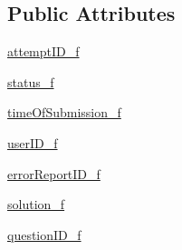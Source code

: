 \subsection*{Public Attributes}
\begin{DoxyCompactItemize}
\item 
\hyperlink{class_ecodena_1_1_attempt_1_1models_1_1_attempt_a5868c5092dc59689fe48af770ea41bc5}{attemptID\_\-f}
\item 
\hyperlink{class_ecodena_1_1_attempt_1_1models_1_1_attempt_aa0e8d9e10aa7d394777a8dcc138b67bf}{status\_\-f}
\item 
\hyperlink{class_ecodena_1_1_attempt_1_1models_1_1_attempt_a4cf15d230e30719df408282601d157fa}{timeOfSubmission\_\-f}
\item 
\hyperlink{class_ecodena_1_1_attempt_1_1models_1_1_attempt_ad138a4fd5a48644d71382b83a9ba4a04}{userID\_\-f}
\item 
\hyperlink{class_ecodena_1_1_attempt_1_1models_1_1_attempt_ac1e3f9e2d93bbdd1d339f9331a560926}{errorReportID\_\-f}
\item 
\hyperlink{class_ecodena_1_1_attempt_1_1models_1_1_attempt_a8cadfc3c3993ddedf4f8a49e67b71e19}{solution\_\-f}
\item 
\hyperlink{class_ecodena_1_1_attempt_1_1models_1_1_attempt_a52c7956666bd826ed90d2db15d6f876b}{questionID\_\-f}
\end{DoxyCompactItemize}
